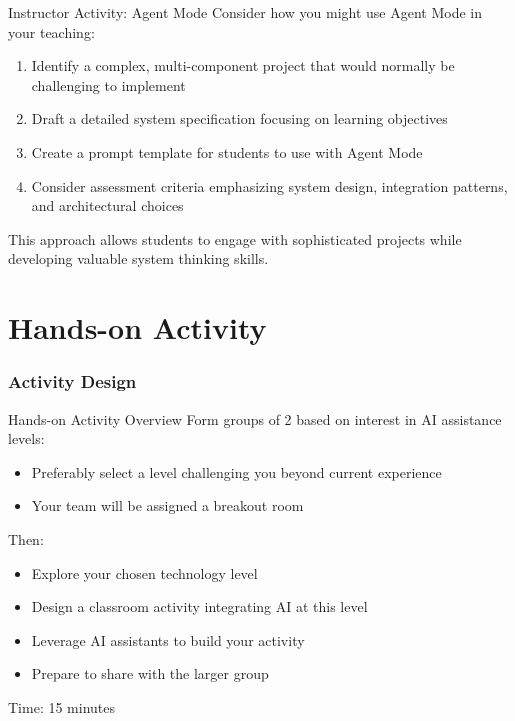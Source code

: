 \documentclass[xcolor=dvipsnames, aspectratio=169]{beamer}
\begin{document}
\begin{frame}{Instructor Activity: Agent Mode}
  Consider how you might use Agent Mode in your teaching:
  
  \begin{enumerate}
    \item Identify a complex, multi-component project that would normally be challenging to implement
    \item Draft a detailed system specification focusing on learning objectives
    \item Create a prompt template for students to use with Agent Mode
    \item Consider assessment criteria emphasizing system design, integration patterns, and architectural choices
  \end{enumerate}
  
  This approach allows students to engage with sophisticated projects while developing valuable system thinking skills.
\end{frame}

\part[Hands-on Activity]{Hands-on Activity}
\section{Activity Design}

\begin{frame}{Hands-on Activity Overview}
  Form groups of 2 based on interest in AI assistance levels:
  \begin{itemize}
    \item Preferably select a level challenging you beyond current experience
    \item Your team will be assigned a breakout room
  \end{itemize}
  
  Then:
  \begin{itemize}
    \item Explore your chosen technology level
    \item Design a classroom activity integrating AI at this level
    \item Leverage AI assistants to build your activity
    \item Prepare to share with the larger group
  \end{itemize}
  
  Time: 15 minutes
\end{frame}
\end{document}
